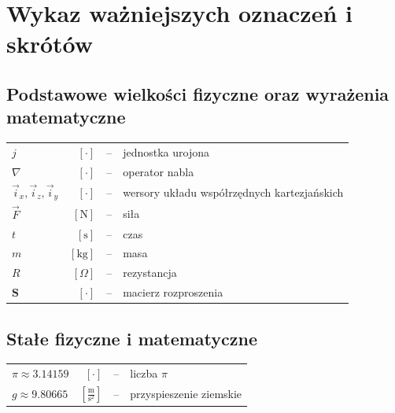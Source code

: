 
\chapter*{Wykaz ważniejszych oznaczeń i skrótów}

\section*{Podstawowe wielkości fizyczne oraz wyrażenia matematyczne}
\noindent
\begin{tabular}{l r c l}
     $j$  &$[\cdot]$  &--&jednostka urojona\\
	 $\nabla$  &$[\cdot]$  &--&operator nabla\\
	 $\vec{i}_{x},\vec{i}_{z},\vec{i}_{y} $ &$[\cdot]$  &--& wersory układu współrzędnych kartezjańskich    \\
	 $\vec{F}$ &$[\text{N}]$  &--& siła \\
	 $t $ &$[\text{s}]$  &--& czas \\
	 $m$  &$[\text{kg}]$  &--& masa \\
	 $R$  &$[\Omega]$  &--&rezystancja\\
	 $\mathbf{S}$  &$[\cdot]$  &--&macierz rozproszenia\\
\end{tabular}

\section*{Stałe fizyczne i matematyczne}
\noindent
	 \begin{tabular}{l r c l}
	$\pi \approx 3.14159 $&$[\cdot]  $ &--& liczba $\pi$\\ 
	$g \approx 9.80665 $&$[\frac{\text{m}}{\text{s}^2}]  $ &--& przyspieszenie ziemskie\\
\end{tabular}

